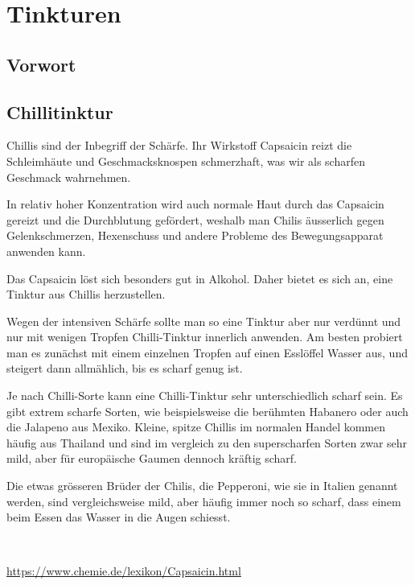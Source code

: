 \chapter{Tinkturen}

\section{Vorwort}

\lipsum[1-5]
\newpage








\section{Chillitinktur}

Chillis sind der Inbegriff der Schärfe. Ihr Wirkstoff Capsaicin reizt die Schleimhäute und Geschmacksknospen schmerzhaft, was wir als scharfen Geschmack wahrnehmen.

In relativ hoher Konzentration wird auch normale Haut durch das Capsaicin gereizt und die Durchblutung gefördert, weshalb man Chilis äusserlich gegen Gelenkschmerzen, Hexenschuss und andere Probleme des Bewegungsapparat anwenden kann.

Das Capsaicin löst sich besonders gut in Alkohol. Daher bietet es sich an, eine Tinktur aus Chillis herzustellen.

Wegen der intensiven Schärfe sollte man so eine Tinktur aber nur verdünnt und nur mit wenigen Tropfen Chilli-Tinktur innerlich anwenden. Am besten probiert man es zunächst mit einem einzelnen Tropfen auf einen Esslöffel Wasser aus, und steigert dann allmählich, bis es scharf genug ist.

Je nach Chilli-Sorte kann eine Chilli-Tinktur sehr unterschiedlich scharf sein. Es gibt extrem scharfe Sorten, wie beispielsweise die berühmten Habanero oder auch die Jalapeno aus Mexiko. Kleine, spitze Chillis im normalen Handel kommen häufig aus Thailand und sind im vergleich zu den superscharfen Sorten zwar sehr mild, aber für europäische Gaumen dennoch kräftig scharf.

Die etwas grösseren Brüder der Chilis, die Pepperoni, wie sie in Italien genannt werden, sind vergleichsweise mild, aber häufig immer noch so scharf, dass einem beim Essen das Wasser in die Augen schiesst.

\cite{tinkturen}  ~\cite{heilkraeuterlexikon}

\url{https://www.chemie.de/lexikon/Capsaicin.html}


